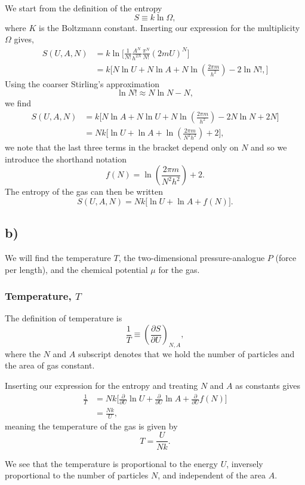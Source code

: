 \documentclass[a4paper, 11pt, titlepage, english]{article}
\begin{document}
We start from the definition of the entropy
$$S \equiv k \ln \Omega,$$
where $K$ is the Boltzmann constant. Inserting our expression for the multiplicity $\Omega$ gives,
\begin{align*}
S(U,A,N) &= k \ln \bigg[\frac{1}{N!}\frac{A^N}{h^{2N}}\frac{\pi^N}{N!}(2mU)^N\bigg] \\
&= k\bigg[N\ln U + N\ln A + N\ln\left(\frac{2\pi m}{h^2}\right) - 2\ln N!,\bigg]
\end{align*}
Using the coarser Stirling's approximation
$$\ln N! \approx N\ln N - N,$$
we find
\begin{align*}
S(U,A,N) &= k\bigg[N\ln A + N\ln U + N\ln\left(\frac{2\pi m}{h^2}\right) - 2N\ln N + 2N \bigg] \\
&= Nk\bigg[\ln U + \ln A   + \ln\left(\frac{2\pi m}{N^2 h^2}\right) + 2\bigg],
\end{align*}
we note that the last three terms in the bracket depend only on $N$ and so we introduce the shorthand notation
$$f(N) = \ln\left(\frac{2\pi m}{N^2 h^2}\right) + 2.$$
The entropy of the gas can then be written
$$S(U,A,N) = Nk\bigg[\ln U + \ln A + f(N)\bigg].$$

\subsection*{b)}
We will find the temperature $T$, the two-dimensional pressure-analogue $P$ (force per length), and the chemical potential $\mu$ for the gas.

\subsubsection*{Temperature, $T$}
The definition of temperature is 
$$\frac{1}{T} \equiv \left(\frac{\partial S}{\partial U}\right)_{N, A},$$
where the $N$ and $A$ subscript denotes that we hold the number of particles and the area of gas constant.

Inserting our expression for the entropy and treating $N$ and $A$ as constants gives
\begin{align*}
\frac{1}{T} &= Nk\bigg[\frac{\partial}{\partial U}\ln U + \frac{\partial}{\partial U} \ln A + \frac{\partial}{\partial U} f(N)\bigg] \\
&= \frac{Nk}{U},
\end{align*}
meaning the temperature of the gas is given by
$$T = \frac{U}{Nk}.$$

We see that the temperature is proportional to the energy $U$, inversely proportional to the number of particles $N$, and independent of the area $A$.
\end{document}

